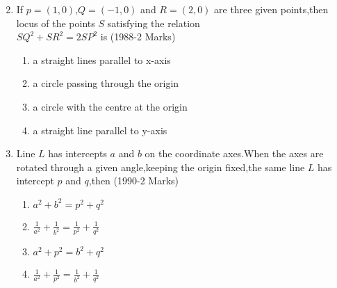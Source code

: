 \documentclass[journal,12pt,twocolumn]{IEEEtran}
\theoremstyle{remark}
\begin{document}
\begin{enumerate}
\begin{multicols}{2}
\begin{enumerate}
    \end{enumerate}
    \end{multicols}
    \item If $p=(1,0)$,$Q=(-1,0)$ and $R=(2,0)$ are three given points,then locus of the points $S$ satisfying the relation\\
    $SQ^2+SR^2=2SP^2$ is 
    \hfill(1988-2 Marks)
    \begin{enumerate}		    
        \item a straight lines parallel to x-axis
        \item a circle passing through the origin
        \item a circle with the centre at the origin 
        \item a straight line parallel to y-axis
    \end{enumerate}	
    \item Line $L$ has intercepts $a$ and $b$ on the coordinate axes.When the axes are rotated through a given angle,keeping the origin fixed,the same line $L$ has intercept $p$ and $q$,then 
    \hfill(1990-2 Marks)
    \begin{multicols}{2}
    \begin{enumerate}
        \item $a^2+b^2=p^2+q^2$
        \item $\frac{1}{a^2}+\frac{1}{b^2}=\frac{1}{p^2}+\frac{1}{q^2}$
        \item $a^2+p^2=b^2+q^2$
        \item $\frac{1}{a^2}+\frac{1}{p^2}=\frac{1}{b^2}+\frac{1}{q^2}$
    \end{enumerate}
    \end{multicols}    
\end{enumerate}
\end{document}
